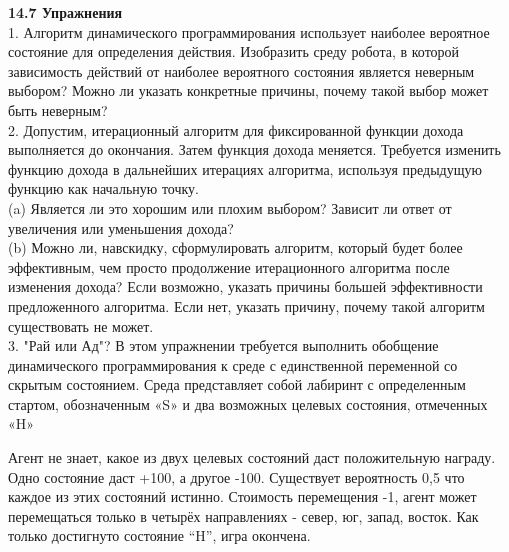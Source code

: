 \documentclass[10pt,a4paper]{article}
\begin{document}
\textbf{14.7	Упражнения}\\

1.	Алгоритм динамического программирования использует наиболее вероятное состояние для определения действия. Изобразить среду робота, в которой зависимость действий от наиболее вероятного состояния является неверным выбором? Можно ли указать конкретные причины, почему такой выбор может быть неверным?\\

2.	Допустим, итерационный алгоритм для фиксированной функции дохода выполняется до окончания. Затем функция дохода меняется. Требуется изменить функцию дохода в дальнейших итерациях алгоритма, используя предыдущую функцию как начальную точку.\\

(a)	Является ли это хорошим или плохим выбором? Зависит ли ответ от увеличения или уменьшения дохода?\\

(b)	Можно ли, навскидку, сформулировать алгоритм, который будет более эффективным, чем просто продолжение итерационного алгоритма после изменения дохода? Если возможно, указать причины большей эффективности предложенного алгоритма. Если нет, указать причину, почему такой алгоритм существовать не может.\\

3.	"Рай или Ад"? В этом упражнении требуется выполнить обобщение динамического программирования к среде с единственной переменной со скрытым состоянием. Среда представляет собой лабиринт с определенным стартом, обозначенным «S» и два возможных целевых состояния, отмеченных «H»

\begin{figure}[H]
	\label{fig:laborig}
\end{figure}

Агент не знает, какое из двух целевых состояний даст положительную награду. Одно состояние даст +100, а другое -100. Существует вероятность 0,5 что каждое из этих состояний истинно.  Стоимость перемещения -1, агент может перемещаться только в четырёх направлениях -  север, юг, запад, восток. Как только достигнуто состояние “H”, игра окончена.\\
\end{document}
